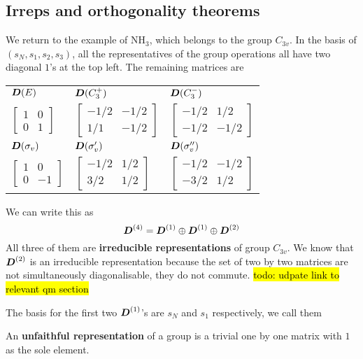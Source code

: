 \subsection{Irreps and orthogonality theorems}
We return to the example of NH$_3$, which belongs to the group $C_{3v}$. 
In the basis of $(s_N,s_1,s_2,s_3)$, all the representatives of 
the group operations all have two diagonal $1$'s at the top left. 
The remaining matrices are
\begin{table}[H]
\centering
\begin{tabular}{l l l}
$\boldsymbol{D}(E)$&$\boldsymbol{D}(C_3^+)$&$\boldsymbol{D}(C_3^-)$\\
$
\begin{bmatrix}
1&0\\
0&1
\end{bmatrix}
$&
$\begin{bmatrix}
-1/2&-1/2\\
1/1&-1/2
\end{bmatrix}$&
$\begin{bmatrix}
-1/2&1/2\\
-1/2&-1/2
\end{bmatrix}$\\
$\boldsymbol{D}(\sigma_v)$&$\boldsymbol{D}(\sigma'_v)$&$\boldsymbol{D}(\sigma''_v)$\\
$\begin{bmatrix}
1&0\\
0&-1
\end{bmatrix}$&
$\begin{bmatrix}
-1/2&1/2\\
3/2&1/2
\end{bmatrix}$&
$\begin{bmatrix}
-1/2&-1/2\\
-3/2&1/2
\end{bmatrix}$
\end{tabular}
\end{table}
We can write this as 
\begin{equation}
\boldsymbol{D}^{(4)}=\boldsymbol{D}^{(1)}\oplus \boldsymbol{D}^{(1)}\oplus \boldsymbol{D}^{(2)}
\end{equation}
All three of them are \textbf{irreducible representations} of group $C_{3v}$. 
We know that $\boldsymbol{D}^{(2)}$ is an irreducible representation because the set 
of two by two matrices are not simultaneously diagonalisable, \ie they do not 
commute. \hl{todo: udpate link to relevant qm section}\par 
The basis for the first two $\boldsymbol{D}^{(1)}$'s are $s_N$ and $s_1$ respectively, 
we call them
\begin{defi}
An \textbf{unfaithful representation} of a group is a trivial one by one matrix 
with $1$ as the sole element. 
\end{defi}
